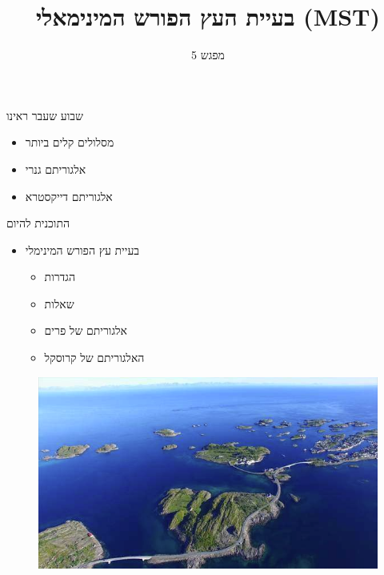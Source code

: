\documentclass[handout]{beamer}
\begin{document}
	\title{בעיית העץ הפורש המינימאלי (MST)}
	\subtitle{מפגש 5}
	\date{}
	
	
	\frame{\titlepage}
	\begin{frame}{שבוע שעבר ראינו}
	\pause
	
	\begin{itemize}[<+->]
		\item מסלולים קלים ביותר
		\item אלגוריתם גנרי
		\item אלגוריתם דייקסטרא
	\end{itemize}
\end{frame}

\begin{frame}{התוכנית להיום}
\pause
\begin{itemize}[<+->]
	\item בעיית עץ הפורש המינימלי
	\begin{itemize}[<+->]
		\item הגדרות
		\item שאלות
		\item אלגוריתם של פרים
		\item האלגוריתם של קרוסקל
	\end{itemize}
\end{itemize}
\end{frame}
\begin{frame}
\begin{figure}
	\centering
	\includegraphics[width=\linewidth]{imgs/island}
\end{figure}


\end{frame}
\end{document}
